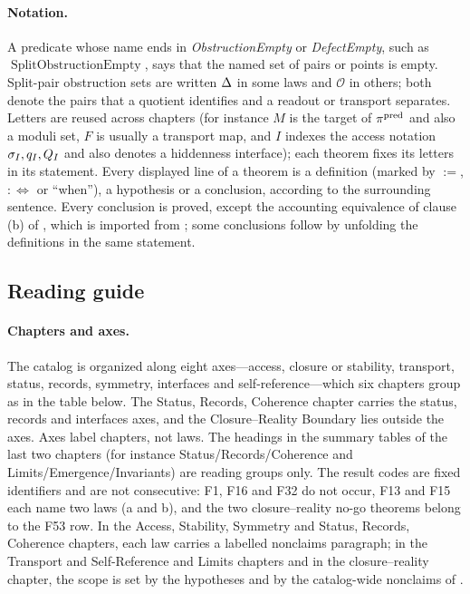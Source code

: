\paragraph{Notation.} A predicate whose name ends in
\emph{ObstructionEmpty} or \emph{DefectEmpty}, such as
\(\operatorname{SplitObstructionEmpty}\), says that the named set of
pairs or points is empty.  Split-pair obstruction sets are written
\(\Delta\) in some laws and \(\mathcal O\) in others; both denote the
pairs that a quotient identifies and a readout or transport separates.
Letters are reused across chapters (for instance \(M\) is the target of
\(\pi^{\mathrm{pred}}\) and also a moduli set, \(F\) is usually a transport map, and
\(I\) indexes the access notation \(\sigma_I,q_I,Q_I\) and also
denotes a hiddenness interface); each theorem fixes its letters in its
statement.  Every displayed line of a theorem is a definition (marked
by \(:=\), \(:\iff\) or ``when''), a hypothesis or a conclusion,
according to the surrounding sentence.  Every conclusion is proved,
except the accounting equivalence of clause (b) of ,
which is imported from \citet{Tsiokos2026AOR}; some conclusions
follow by unfolding the definitions in the same statement.

\subsection{Reading guide}\label{subsec:reading-guide}

\paragraph{Chapters and axes.}
The catalog is organized along eight axes---access, closure or
stability, transport, status, records, symmetry, interfaces and
self-reference---which six chapters group as in the table below.  The
Status, Records, Coherence chapter carries the status, records and
interfaces axes, and the Closure--Reality Boundary lies outside the
axes.  Axes label chapters, not laws.  The headings in the summary
tables of the last two chapters (for instance Status/Records/Coherence
and Limits/Emergence/Invariants) are reading groups only.  The result
codes are fixed identifiers and are not consecutive: F1, F16 and F32 do
not occur, F13 and F15 each name two laws (a and b), and the two
closure--reality no-go theorems belong to the F53 row.  In the Access,
Stability, Symmetry and Status, Records, Coherence chapters, each law
carries a labelled nonclaims paragraph; in the Transport and
Self-Reference and Limits chapters and in the closure--reality chapter,
the scope is set by the hypotheses and by the catalog-wide nonclaims of
.

